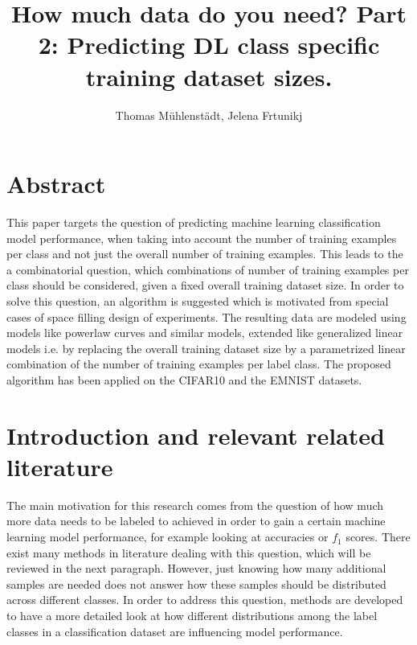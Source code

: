 \documentclass{article} %
\title{How much data do you need? Part 2: Predicting DL class specific training dataset sizes.}
\author{Thomas Mühlenstädt, Jelena Frtunikj}
\begin{document}
\maketitle

\section*{Abstract}

This paper targets the question of predicting machine learning classification model performance, when taking into account the number of training examples per class and not just the overall number of training examples.
This leads to the a combinatorial question, which combinations of number of training examples per class should be considered, given a fixed overall training dataset size. In order to solve this question, an algorithm is suggested which is motivated from special cases of space filling design of experiments.
The resulting data are modeled using models like powerlaw curves and similar models, extended like generalized linear models i.e. by replacing the overall training dataset size by a parametrized linear combination of the number of  training examples per label class. 
The proposed algorithm has been applied on the CIFAR10 and the EMNIST datasets.

\section{Introduction and relevant related literature}

The main motivation for this research comes from the question of how much more data needs to be labeled to achieved in order to gain a certain machine learning model performance, for example looking at accuracies or $f_1$ scores. There exist many methods in literature dealing with this question, which will be reviewed in the next paragraph. However, just knowing how many additional samples are needed does not answer how these samples should be distributed across different classes. In order to address this question, methods are developed to have a more detailed look at how different distributions among the label classes in a classification dataset are influencing model performance.
\end{document}
